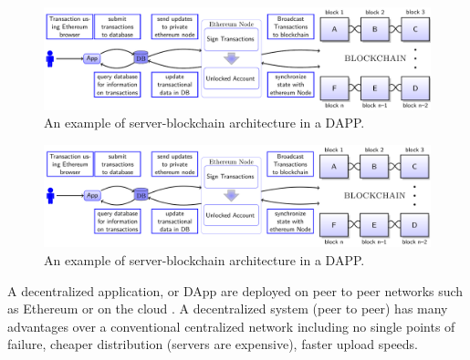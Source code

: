 	
	\begin{warpprint}
	\begin{figure}[ht]
	\includegraphics[width=1\linewidth]{Diagrams/blockchainInSimpleApp.pdf}
	\caption{An example of server-blockchain architecture in a DAPP.}
	\label{fig:DApp}
	\end{figure}
	\end{warpprint}
	
	\begin{warpHTML}
	\begin{figure}[ht]
	\includegraphics[width=1.2\linewidth]{Diagrams/blockchainInSimpleApp.svg}
	\caption{An example of server-blockchain architecture in a DAPP.}
	\label{fig:DApp}
	\end{figure}
	\end{warpHTML}
	
	A decentralized application, or \gls{DApp} are deployed on peer to peer networks such as \gls{Ethereum} or on the cloud \footnotemark. A decentralized system (peer to peer) has many advantages over a conventional centralized network including no single points of failure, cheaper distribution (servers are expensive), faster upload speeds. 
	
